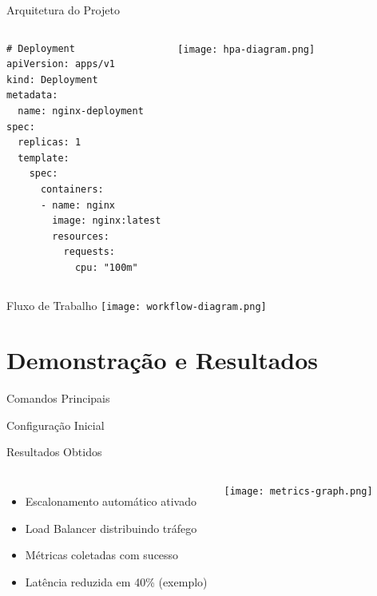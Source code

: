\documentclass{beamer}
\begin{document}
\begin{frame}[fragile]{Arquitetura do Projeto}
    \begin{columns}
        \begin{lstlisting}
# Deployment
apiVersion: apps/v1
kind: Deployment
metadata:
  name: nginx-deployment
spec:
  replicas: 1
  template:
    spec:
      containers:
      - name: nginx
        image: nginx:latest
        resources:
          requests:
            cpu: "100m"
        \end{lstlisting}

        \texttt{[image: hpa-diagram.png]}
    \end{columns}
\end{frame}

\begin{frame}{Fluxo de Trabalho}
    \centering
    \texttt{[image: workflow-diagram.png]}
\end{frame}

\section{Demonstração e Resultados}

\begin{frame}{Comandos Principais}
    \begin{exampleblock}{Configuração Inicial}
        
    \end{exampleblock}
\end{frame}

\begin{frame}{Resultados Obtidos}
    \begin{columns}
        \begin{itemize}
            \item Escalonamento automático ativado
            \item Load Balancer distribuindo tráfego
            \item Métricas coletadas com sucesso
            \item Latência reduzida em 40\% (exemplo)
        \end{itemize}

        \centering
        \texttt{[image: metrics-graph.png]}
    \end{columns}
\end{frame}
\end{document}
